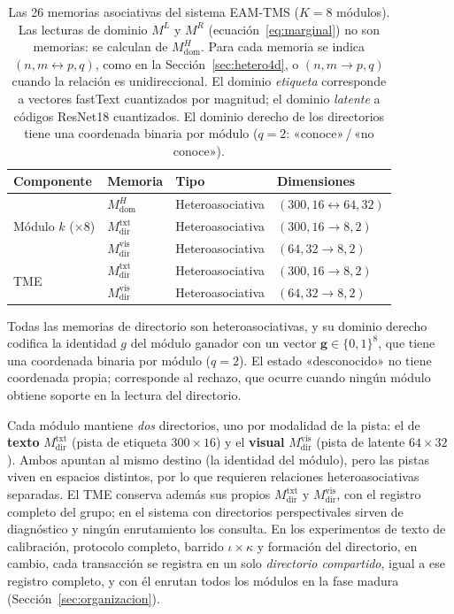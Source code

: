 \begin{table}[H]
\centering
\caption[Las 26 memorias asociativas del sistema EAM-TMS]{Las 26 memorias asociativas del sistema EAM-TMS ($K=8$ módulos).
Las lecturas de dominio $M^L$ y $M^R$ (ecuación~\eqref{eq:marginal}) no son memorias: se
calculan de $M^H_{\mathrm{dom}}$.
Para cada memoria se indica $(n, m \leftrightarrow p, q)$, como en la
Sección~\ref{sec:hetero4d}, o $(n, m \to p, q)$ cuando la relación es unidireccional.
El dominio \emph{etiqueta} corresponde a vectores fastText cuantizados por magnitud;
el dominio \emph{latente} a códigos ResNet18 cuantizados.
El dominio derecho de los directorios tiene una coordenada binaria por módulo
($q{=}2$: «conoce»\,/\,«no conoce»).}
\label{tab:memorias}
\small
\begin{tabular}{@{}llll@{}}
\toprule
\textbf{Componente} & \textbf{Memoria} & \textbf{Tipo} & \textbf{Dimensiones} \\
\midrule
\multirow{3}{*}{Módulo $k$ ($\times 8$)} &
  $M^H_{\mathrm{dom}}$ & Heteroasociativa & $(300, 16 \leftrightarrow 64, 32)$ \\
& $M^{\mathrm{txt}}_{\mathrm{dir}}$ & Heteroasociativa & $(300, 16 \to 8, 2)$ \\
& $M^{\mathrm{vis}}_{\mathrm{dir}}$ & Heteroasociativa & $(64, 32 \to 8, 2)$ \\
\midrule
\multirow{2}{*}{TME} &
  $M^{\mathrm{txt}}_{\mathrm{dir}}$ & Heteroasociativa & $(300, 16 \to 8, 2)$ \\
& $M^{\mathrm{vis}}_{\mathrm{dir}}$ & Heteroasociativa & $(64, 32 \to 8, 2)$ \\
\bottomrule
\end{tabular}
\end{table}

Todas las memorias de directorio son heteroasociativas, y su dominio derecho codifica
la identidad $g$ del módulo ganador con un vector $\mathbf{g} \in \{0,1\}^{8}$, que tiene
una coordenada binaria por módulo ($q{=}2$).
El estado «desconocido» no tiene coordenada propia; corresponde al rechazo, que ocurre cuando
ningún módulo obtiene soporte en la lectura del directorio.

Cada módulo mantiene \emph{dos} directorios, uno por modalidad de la pista: el de
\textbf{texto} $M^{\mathrm{txt}}_{\mathrm{dir}}$ (pista de etiqueta $300\times16$) y el \textbf{visual}
$M^{\mathrm{vis}}_{\mathrm{dir}}$ (pista de latente $64\times32$). Ambos apuntan al mismo destino (la
identidad del módulo), pero las pistas viven en espacios distintos, por lo que requieren
relaciones heteroasociativas separadas.
El TME conserva además sus propios $M^{\mathrm{txt}}_{\mathrm{dir}}$ y
$M^{\mathrm{vis}}_{\mathrm{dir}}$, con el registro completo del grupo; en el sistema con
directorios perspectivales sirven de diagnóstico y ningún enrutamiento los consulta.
En los experimentos de texto de calibración, protocolo completo, barrido
$\iota \times \kappa$ y formación del directorio, en cambio, cada transacción se
registra en un solo \emph{directorio compartido}, igual a ese registro completo, y con
él enrutan todos los módulos en la fase madura (Sección~\ref{sec:organizacion}).

